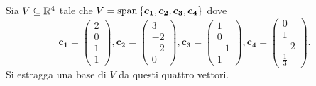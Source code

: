 \begin{example}
    Sia $V \subseteq \mathbb{R}^4$ tale che $V = \operatorname{span}\left\{\bm{c_1}, \bm{c_2}, \bm{c_3}, \bm{c_4}\right\}$ dove \[
        \bm{c_1} = \begin{pmatrix}
            2 \\ 0 \\ 1 \\ 1
        \end{pmatrix}, \bm{c_2} = \begin{pmatrix}
            3 \\ -2 \\ -2 \\ 0
        \end{pmatrix}, \bm{c_3} = \begin{pmatrix}
            1 \\ 0 \\ -1 \\ 1
        \end{pmatrix}, \bm{c_4} = \begin{pmatrix}
            0 \\ 1 \\ -2 \\ \frac{1}{3}
        \end{pmatrix}.
    \] Si estragga una base di $V$ da questi quattro vettori.
\end{example}
